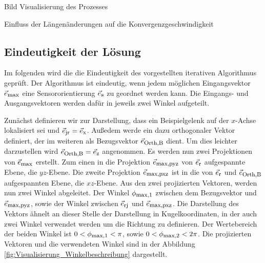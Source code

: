 Bild Visualisierung des Prozesses

Einfluss der Längenänderungen auf die Konvergenzgeschwindigkeit


	\subsection{Eindeutigkeit der Lösung}
	Im folgenden wird die die Eindeutigkeit des vorgestellten iterativen Algorithmus geprüft. Der Algorithmus ist eindeutig, wenn jedem möglichen Eingangsvektor $\vec{e}_{\textrm{\footnotesize{max}}}$ eine Sensororientierung $\vec{e}_{\textrm{\footnotesize{s}}}$ zu geordnet werden kann. Die Eingangs- und Ausgangsvektoren werden dafür in jeweils zwei Winkel aufgeteilt. 

	Zunächst definieren wir zur Darstellung, dass ein  Beispielgelenk auf der $x$-Achse lokalisiert sei und $\vec{e}_{\textrm{\footnotesize{jr}}} = \vec{e}_{\textrm{\footnotesize{x}}}$. Außedem werde ein dazu orthogonaler Vektor definiert, der im weiteren als Bezugsvektor $\vec{e}_{\textrm{\footnotesize{Orth,B}}}$ dient. Um dies leichter darzustellen wird $\vec{e}_{\textrm{\footnotesize{Orth,B}}}=\vec{e}_{\textrm{\footnotesize{z}}}$ angenommen. Es werden nun zwei Projektionen von $\vec{e}_{\textrm{\footnotesize{max}}}$ erstellt. Zum einen in die Projektion $\vec{e}_{\textrm{\footnotesize{max,pyz}}}$ von $\vec{e}_{\textrm{\footnotesize{r}}}$ aufgespannte Ebene, die $yz$-Ebene. Die zweite Projektion $\vec{e}_{\textrm{\footnotesize{max,pxz}}}$ ist in die von $\vec{e}_{\textrm{\footnotesize{r}}}$ und $\vec{e}_{\textrm{\footnotesize{Orth,B}}}$ aufgespannten Ebene, die $xz$-Ebene. Aus den zwei projizierten Vektoren, werden nun zwei Winkel abgeleitet. Der Winkel $\phi_{\textrm{\footnotesize{max,1}}}$ zwischen dem Bezugsvektor und $\vec{e}_{\textrm{\footnotesize{max,pyz}}}$, sowie der Winkel zwischen $\vec{e}_{\textrm{\footnotesize{rj}}}$ und $\vec{e}_{\textrm{\footnotesize{max,pxz}}}$. Die Darstellung des Vektors ähnelt an dieser Stelle der Darstellung in Kugelkoordinaten, in der auch zwei Winkel verwendet werden um die Richtung zu definieren. Der Wertebereich der beiden Winkel ist $0 < \phi_{\textrm{\footnotesize{max,1}}}< \pi$, sowie $0< \phi_{\textrm{\footnotesize{max,2}}} < 2\pi$. 
	Die projizierten Vektoren und die verwendeten Winkel sind in der Abbildung \ref{fig:Visualisierung_Winkelbeschreibung} dargestellt.
	
